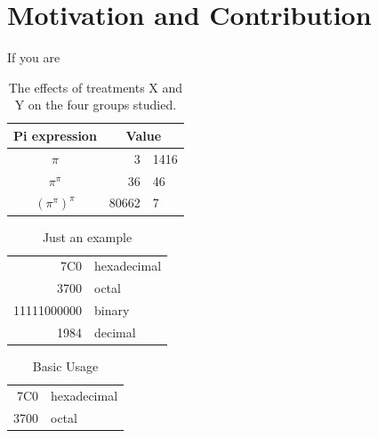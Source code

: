 

\section{Motivation and Contribution}\label{sec:motivation_and_contribution}
If you are
\begin{table}
    \label{tab:treatments}
    \centering
    \begin{tabular}{c r @{.} l}
        Pi expression       &
        \multicolumn{2}{c}{Value} \\
        \hline
        $\pi$               & 3&1416  \\
        $\pi^{\pi}$         & 36&46   \\
        $(\pi^{\pi})^{\pi}$ & 80662&7 \\
    \end{tabular}
    \caption{The effects of treatments X and Y on the four groups studied.}
\end{table}

\begin{table}
    \label{tab:tabular_example1}
    \centering
    \begin{tabular}[t]{|r|l|}
        \hline
        7C0 & hexadecimal \\
        3700 & octal \\
        \cline{2-2} 11111000000 & binary \\
        \hline
        \hline
        1984 & decimal \\
        \hline
    \end{tabular}
\caption{Just an example}
\end{table}

\begin{table}
    \label{tab:tabular_example2}
    \centering
    \begin{tabular}{|r|l|}
        \hline
        7C0 & hexadecimal \\
        3700 & octal \\
        \hline
    \end{tabular}
\caption{Basic Usage}
\end{table}

